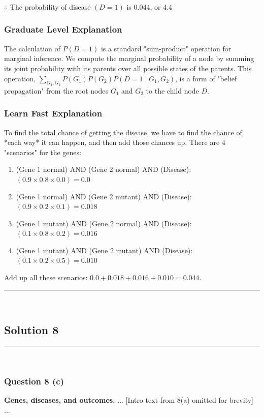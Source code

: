 \documentclass{article}
\begin{document}
\subsubsection*{\normalfont}{$\therefore$ The probability of disease $(D=1)$ is $0.044$, or 4.4%

\subsubsection*{Graduate Level Explanation}
The calculation of $P(D=1)$ is a standard "sum-product" operation for marginal inference. We compute the marginal probability of a node by summing its joint probability with its parents over all possible states of the parents. This operation, $\sum_{G_1, G_2} P(G_1)P(G_2)P(D=1 \mid G_1, G_2)$, is a form of "belief propagation" from the root nodes $G_1$ and $G_2$ to the child node $D$.

\subsubsection*{Learn Fast Explanation}
To find the total chance of getting the disease, we have to find the chance of *each way* it can happen, and then add those chances up. There are 4 "scenarios" for the genes:
\begin{enumerate}
    \item (Gene 1 normal) AND (Gene 2 normal) AND (Disease): $(0.9 \times 0.8 \times 0.0) = 0.0$
    \item (Gene 1 normal) AND (Gene 2 mutant) AND (Disease): $(0.9 \times 0.2 \times 0.1) = 0.018$
    \item (Gene 1 mutant) AND (Gene 2 normal) AND (Disease): $(0.1 \times 0.8 \times 0.2) = 0.016$
    \item (Gene 1 mutant) AND (Gene 2 mutant) AND (Disease): $(0.1 \times 0.2 \times 0.5) = 0.010$
\end{enumerate}
Add up all these scenarios: $0.0 + 0.018 + 0.016 + 0.010 = 0.044$.

\noindent\rule{\textwidth}{0.4pt}\\

\newpage

\subsection*{Solution 8}
\noindent\rule{\textwidth}{0.4pt}\\
\subsubsection*{Question 8 (c)}
\begin{flushleft}
    \textbf{Genes, diseases, and outcomes.} ... [Intro text from 8(a) omitted for brevity] ...


\end{flushleft}}
\end{document}
